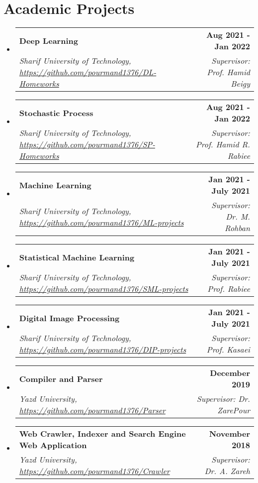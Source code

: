 \documentclass[letterpaper,11pt]{article}
\makeatletter
\newcommand{\resumeSubheading}[4]{
  \vspace{-2pt}\item
    \begin{tabular*}{1.0\textwidth}[t]{l@{\extracolsep{\fill}}r}
      \textbf{#1} & \textbf{\small #2} \\
    \textcolor{sgray} {\textit{\small#3}} & \textcolor{sgray}{ \textit{\small #4} }\\
    \end{tabular*}\vspace{-7pt}
}
\newcommand{\resumeSubHeadingListStart}{\begin{itemize}[leftmargin=0.0in, label={}]}
\newcommand{\resumeSubHeadingListEnd}{\end{itemize}}
\makeatother
\begin{document}
\begin{comment}
\resumeSubHeadingListStart
    \resumeSubheading
      {Malek Sabet High School}{Sep 2012 - June. 2016}
      {Diploma in Physics and Mathematics Discipline}{Yazd, Iran}
  \resumeSubHeadingListEnd
 \small{ GPA: \textbf{19.49}/20, Units: 102, {\href{https://en.wikipedia.org/wiki/Governmental_leading_high_school}{ Affiliation: Governmental leading high school}}
\end{comment}  

\section{Academic Projects}

\resumeSubHeadingListStart
\resumeSubheading
{Deep Learning}{Aug 2021 - Jan 2022}
{Sharif University of Technology, \url{https://github.com/pourmand1376/DL-Homeworks}}{Supervisor: Prof. Hamid Beigy}
\resumeSubHeadingListEnd

\resumeSubHeadingListStart
\resumeSubheading
{Stochastic Process}{Aug 2021 - Jan 2022}
{Sharif University of Technology, \url{https://github.com/pourmand1376/SP-Homeworks}}{Supervisor: Prof. Hamid R. Rabiee}
\resumeSubHeadingListEnd

\resumeSubHeadingListStart
\resumeSubheading
{Machine Learning}{Jan 2021 - July 2021}
{Sharif University of Technology, \url{https://github.com/pourmand1376/ML-projects}}{Supervisor: Dr. M. Rohban}

\resumeSubHeadingListEnd

\resumeSubHeadingListStart
\resumeSubheading
{Statistical Machine Learning}{Jan 2021 - July 2021}
{Sharif University of Technology, \url{https://github.com/pourmand1376/SML-projects}}{Supervisor: Prof. Rabiee}

\resumeSubHeadingListEnd


\resumeSubHeadingListStart
\resumeSubheading
{Digital Image Processing}{Jan 2021 - July 2021}
{Sharif University of Technology, \url{https://github.com/pourmand1376/DIP-projects}}{Supervisor: Prof. Kasaei}

\resumeSubHeadingListEnd



\resumeSubHeadingListStart
\resumeSubheading
{Compiler and Parser}{December 2019}
{Yazd University, \url{https://github.com/pourmand1376/Parser}}{Supervisor: Dr. ZarePour}
{ 
}
\resumeSubHeadingListEnd


\resumeSubHeadingListStart
\resumeSubheading
{Web Crawler, Indexer and Search Engine Web Application}{November 2018}
{Yazd University, \url{https://github.com/pourmand1376/Crawler}}{Supervisor: Dr. A. Zareh}
{ %
}  
\resumeSubHeadingListEnd
\end{document}
